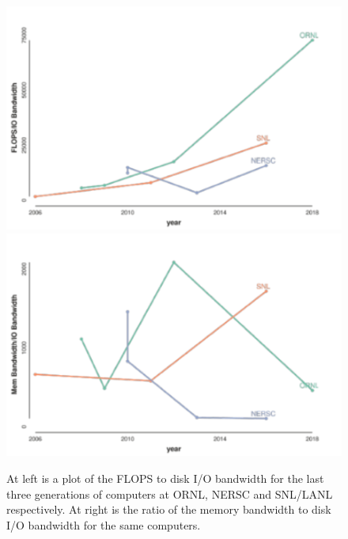 \begin{refsection}
\begin{figure}[t]
	\includegraphics[width=.45\textwidth]{fig-44L} \space{5mm}	
	\includegraphics[width=.45\textwidth]{fig-44R}
	\caption{At left is a plot of the FLOPS to disk I/O bandwidth for the last three generations of computers at ORNL, NERSC and SNL/LANL respectively. At right is the ratio of the memory bandwidth to disk I/O bandwidth for the same computers.\label{fig:44}}
\end{figure}


\end{refsection}
